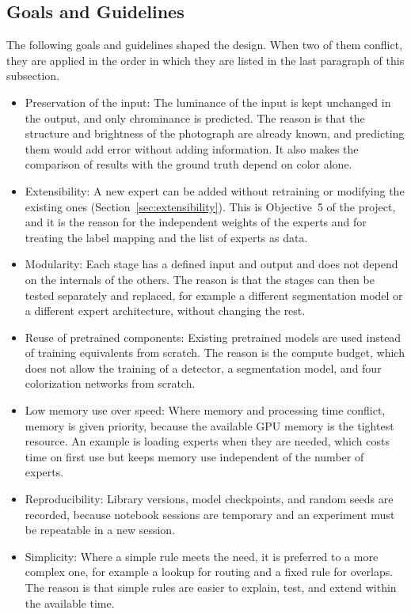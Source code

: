 \documentclass{FastFyp}
\begin{document}
\subsection{Goals and Guidelines}

The following goals and guidelines shaped the design. When two of them conflict, they are applied in the order in which they are listed in the last paragraph of this subsection.

\begin{itemize}
    \item Preservation of the input: The luminance of the input is kept unchanged in the output, and only chrominance is predicted. The reason is that the structure and brightness of the photograph are already known, and predicting them would add error without adding information. It also makes the comparison of results with the ground truth depend on color alone.
    \item Extensibility: A new expert can be added without retraining or modifying the existing ones (Section~\ref{sec:extensibility}). This is Objective~5 of the project, and it is the reason for the independent weights of the experts and for treating the label mapping and the list of experts as data.
    \item Modularity: Each stage has a defined input and output and does not depend on the internals of the others. The reason is that the stages can then be tested separately and replaced, for example a different segmentation model or a different expert architecture, without changing the rest.
    \item Reuse of pretrained components: Existing pretrained models are used instead of training equivalents from scratch. The reason is the compute budget, which does not allow the training of a detector, a segmentation model, and four colorization networks from scratch.
    \item Low memory use over speed: Where memory and processing time conflict, memory is given priority, because the available GPU memory is the tightest resource. An example is loading experts when they are needed, which costs time on first use but keeps memory use independent of the number of experts.
    \item Reproducibility: Library versions, model checkpoints, and random seeds are recorded, because notebook sessions are temporary and an experiment must be repeatable in a new session.
    \item Simplicity: Where a simple rule meets the need, it is preferred to a more complex one, for example a lookup for routing and a fixed rule for overlaps. The reason is that simple rules are easier to explain, test, and extend within the available time.
\end{itemize}
\end{document}
